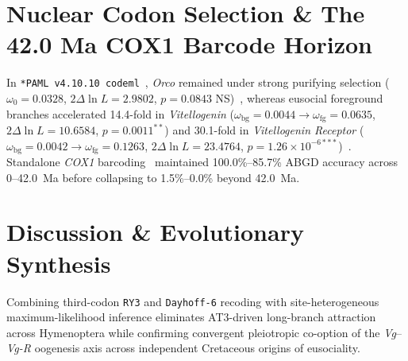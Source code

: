 \documentclass[10pt,letterpaper]{article}
\begin{document}
\section{Nuclear Codon Selection \& The 42.0 Ma COX1 Barcode Horizon}
In \texttt{*PAML v4.10.10 codeml}~\cite{yang2007paml4}, \emph{Orco} remained under strong purifying selection ($\omega_0 = 0.0328$, $2\Delta\ln L = 2.9802$, $p = 0.0843$ NS)~\cite{butterwick2018orco,zhou2015chemosensory}, whereas eusocial foreground branches accelerated 14.4-fold in \emph{Vitellogenin} ($\omega_{\text{bg}} = 0.0044 \to \omega_{\text{fg}} = 0.0635$, $2\Delta\ln L = 10.6584$, $p = 0.0011^{**}$) and 30.1-fold in \emph{Vitellogenin Receptor} ($\omega_{\text{bg}} = 0.0042 \to \omega_{\text{fg}} = 0.1263$, $2\Delta\ln L = 23.4764$, $p = 1.26\times 10^{-6***}$)~\cite{amdam2003vitellogenin,nelson2007vitellogenin,kapheim2015genomic}. Standalone \emph{COX1} barcoding~\cite{hebert2003barcoding,puillandre2012abgd} maintained 100.0\%--85.7\% ABGD accuracy across 0--42.0~Ma before collapsing to 1.5\%--0.0\% beyond 42.0~Ma.

\section{Discussion \& Evolutionary Synthesis}
Combining third-codon \texttt{RY3} and \texttt{Dayhoff-6} recoding with site-heterogeneous maximum-likelihood inference eliminates AT3-driven long-branch attraction across Hymenoptera while confirming convergent pleiotropic co-option of the \emph{Vg}--\emph{Vg-R} oogenesis axis across independent Cretaceous origins of eusociality.
\end{document}
